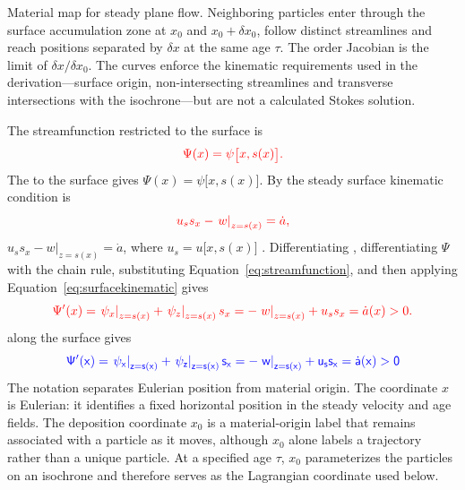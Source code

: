 \documentclass[review]{igs}
\providecommand{\DIFadd}[1]{{\protect\color{blue} \sf #1}} %
\providecommand{\DIFdel}[1]{{\protect\color{red} \scriptsize #1}} %
\providecommand{\DIFaddbegin}{} %
\providecommand{\DIFaddend}{} %
\providecommand{\DIFdelbegin}{} %
\providecommand{\DIFdelend}{} %
\providecommand{\DIFdelFL}[1]{\DIFdel{#1}} %
\newcommand{\DIFscaledelfig}{0.5}
\newlength{\DIFdelgraphicswidth} %
\newlength{\DIFdelgraphicsheight} %
\newcommand{\DIFaddincludegraphics}[2][]{{\color{blue}\fbox{\DIFOincludegraphics[#1]{#2}}}} %
\newcommand{\DIFdelincludegraphics}[2][]{%
\sbox{\DIFdelgraphicsbox}{\DIFOincludegraphics[#1]{#2}}%
\settoboxwidth{\DIFdelgraphicswidth}{\DIFdelgraphicsbox} %
\settoboxtotalheight{\DIFdelgraphicsheight}{\DIFdelgraphicsbox} %
\scalebox{\DIFscaledelfig}{%
\parbox[b]{\DIFdelgraphicswidth}{\usebox{\DIFdelgraphicsbox}\\[-\baselineskip] \rule{\DIFdelgraphicswidth}{0em}}\llap{\resizebox{\DIFdelgraphicswidth}{\DIFdelgraphicsheight}{%
\setlength{\unitlength}{\DIFdelgraphicswidth}%
\begin{picture}(1,1)%
\thicklines\linethickness{2pt} %
{\color[rgb]{1,0,0}\put(0,0){\framebox(1,1){}}}%
{\color[rgb]{1,0,0}\put(0,0){\line( 1,1){1}}}%
{\color[rgb]{1,0,0}\put(0,1){\line(1,-1){1}}}%
\end{picture}%
}\hspace*{3pt}}} %
} %
\DeclareRobustCommand{\DIFaddbegin}{\DIFOaddbegin \let\includegraphics\DIFaddincludegraphics} %
\DeclareRobustCommand{\DIFaddend}{\DIFOaddend \let\includegraphics\DIFOincludegraphics} %
\DeclareRobustCommand{\DIFdelbegin}{\DIFOdelbegin \let\includegraphics\DIFdelincludegraphics} %
\DeclareRobustCommand{\DIFdelend}{\DIFOaddend \let\includegraphics\DIFOincludegraphics} %
\begin{document}
{%
\DIFdelFL{Material map for steady plane flow. Neighboring particles enter through the surface accumulation zone at \(x_0\) and \(x_0+\delta x_0\), follow distinct streamlines and reach positions separated by \(\delta x\) at the same age \(\tau\). The order Jacobian is the limit of \(\delta x/\delta x_0\). The curves enforce the kinematic requirements used in the derivation---surface origin, non-intersecting streamlines and transverse intersections with the isochrone---but are not a calculated Stokes solution.}}

\DIFdel{The streamfunction restricted to the surface is
}\begin{displaymath}
\DIFdel{\Psi(x)=\psi\bigl[x,s(x)\bigr].
}\end{displaymath}%
\DIFdel{The }\DIFdelend \DIFaddbegin \DIFadd{to the surface gives \(\Psi(x)=\psi\bigl[x,s(x)\bigr]\). By the }\DIFaddend steady surface kinematic condition \DIFdelbegin \DIFdel{is
}\begin{displaymath}
 \DIFdel{u_s s_x-\left.w\right|_{z=s(x)}=\dot a,
}\end{displaymath}%
\DIFdelend \DIFaddbegin \DIFadd{\(u_s s_x-\left.w\right|_{z=s(x)}=\dot a\), }\DIFaddend where \(u_s=u\bigl[x,s(x)\bigr]\)\DIFdelbegin \DIFdel{. Differentiating }\DIFdelend \DIFaddbegin \DIFadd{, differentiating }\DIFaddend \(\Psi\) \DIFdelbegin \DIFdel{with the chain rule, substituting Equation~\ref{eq:streamfunction}, and then applying Equation~\ref{eq:surfacekinematic} gives
}\begin{displaymath}
\DIFdel{\Psi'(x)
=\left.\psi_x\right|_{z=s(x)}+\left.\psi_z\right|_{z=s(x)}s_x
=-\left.w\right|_{z=s(x)}+u_ss_x
=\dot a(x)>0.
}\end{displaymath}%
\DIFdelend \DIFaddbegin \DIFadd{along the surface gives
}\begin{equation}
\DIFadd{\Psi'(x)
=\left.\psi_x\right|_{z=s(x)}+\left.\psi_z\right|_{z=s(x)}s_x
=-\left.w\right|_{z=s(x)}+u_ss_x
=\dot a(x)>0
\label{eq:PsiPrime}
}\end{equation}\DIFaddend 
\DIFdelbegin \DIFdel{The notation separates Eulerian position from material origin. The coordinate \(x\) is Eulerian: it identifies a fixed horizontal position in the steady velocity and age fields. The deposition coordinate \(x_0\) is a material-origin label that remains associated with a particle as it moves, although \(x_0\) alone labels a trajectory rather than a unique particle. At a specified age \(\tau\), \(x_0\) parameterizes the particles on an isochrone and therefore serves as the Lagrangian coordinate used below.
}%
\end{document}
